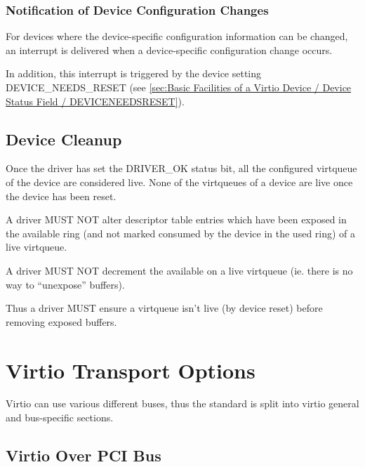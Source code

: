 \subsection{Notification of Device Configuration Changes}\label{sec:General Initialization And Device Operation / Device Operation / Notification of Device Configuration Changes}

For devices where the device-specific configuration information can be changed, an
interrupt is delivered when a device-specific configuration change occurs.

In addition, this interrupt is triggered by the device setting
DEVICE_NEEDS_RESET (see \ref{sec:Basic Facilities of a Virtio Device / Device Status Field / DEVICENEEDSRESET}).

\section{Device Cleanup}\label{sec:General Initialization And Device Operation / Device Cleanup}

Once the driver has set the DRIVER_OK status bit, all the configured
virtqueue of the device are considered live.  None of the virtqueues
of a device are live once the device has been reset.


A driver MUST NOT alter descriptor table entries which have been
exposed in the available ring (and not marked consumed by the device
in the used ring) of a live virtqueue.

A driver MUST NOT decrement the available  on a live virtqueue (ie.
there is no way to ``unexpose'' buffers).

Thus a driver MUST ensure a virtqueue isn't live (by device reset) before removing exposed buffers.

\chapter{Virtio Transport Options}\label{sec:Virtio Transport Options}

Virtio can use various different buses, thus the standard is split
into virtio general and bus-specific sections.

\section{Virtio Over PCI Bus}\label{sec:Virtio Transport Options / Virtio Over PCI Bus}

